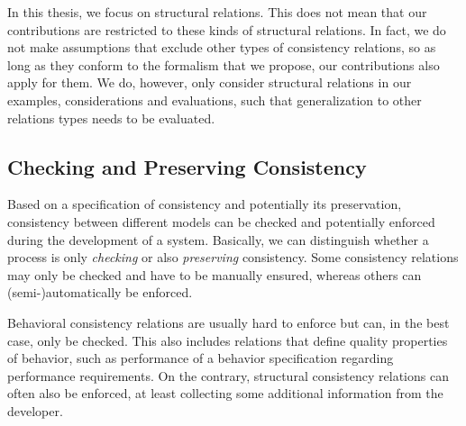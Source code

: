 In this thesis, we focus on structural relations.
This does not mean that our contributions are restricted to these kinds of structural relations.
In fact, we do not make assumptions that exclude other types of consistency relations, so as long as they conform to the formalism that we propose, our contributions also apply for them.
We do, however, only consider structural relations in our examples, considerations and evaluations, such that generalization to other relations types needs to be evaluated.


\subsection{Checking and Preserving Consistency}

Based on a specification of consistency and potentially its preservation, consistency between different models can be checked and potentially enforced during the development of a system.
Basically, we can distinguish whether a process is only \emph{checking} or also \emph{preserving} consistency.
Some consistency relations may only be checked and have to be manually ensured, whereas others can (semi-)automatically be enforced.

Behavioral consistency relations are usually hard to enforce but can, in the best case, only be checked.
This also includes relations that define quality properties of behavior, such as performance of a behavior specification regarding performance requirements.
On the contrary, structural consistency relations can often also be enforced, at least collecting some additional information from the developer.


